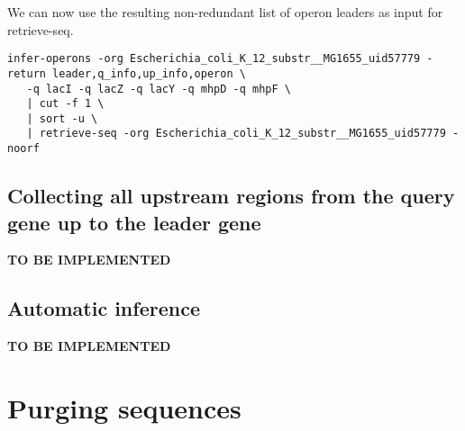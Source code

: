 We can now use the resulting non-redundant list of operon leaders as
input for retrieve-seq.

\begin{lstlisting}
infer-operons -org Escherichia_coli_K_12_substr__MG1655_uid57779 -return leader,q_info,up_info,operon \
   -q lacI -q lacZ -q lacY -q mhpD -q mhpF \
   | cut -f 1 \
   | sort -u \
   | retrieve-seq -org Escherichia_coli_K_12_substr__MG1655_uid57779 -noorf
\end{lstlisting}


\subsection{Collecting all upstream regions from the query gene up to
  the leader gene}

\textbf{TO BE IMPLEMENTED}

\subsection{Automatic inference}

\textbf{TO BE IMPLEMENTED}


\section{Purging sequences}

\tbw
